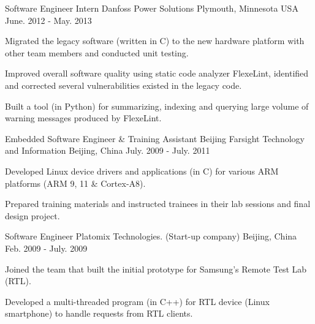 \begin{cventries}
  \cventry
    {Software Engineer Intern} %
    {Danfoss Power Solutions} %
    {Plymouth, Minnesota USA} %
    {June. 2012 - May. 2013} %
    {
      \begin{cvitems} %
        \item {Migrated the legacy software (written in C) to the new hardware
    platform with other team members and conducted unit testing.}
       \item {Improved overall software quality using static code analyzer FlexeLint, identified
    and corrected several vulnerabilities existed in the legacy code.}
           \item {Built a tool (in Python) for summarizing, indexing and
    querying large volume of warning messages produced by FlexeLint.}
      \end{cvitems}
    }

  \cventry
    {Embedded Software Engineer \& Training Assistant} %
    {Beijing Farsight Technology and Information} %
    {Beijing, China} %
    {July. 2009 - July. 2011} %
    {
      \begin{cvitems} %
        \item {Developed Linux device drivers and applications (in C) for various ARM
    platforms (ARM 9, 11 \& Cortex-A8).}
        \item {Prepared training materials and instructed trainees in
    their lab sessions and final design project.}
      \end{cvitems}
    }

  \cventry
    {Software Engineer} %
    {Platomix Technologies. (Start-up company)} %
    {Beijing, China} %
    {Feb. 2009 - July. 2009} %
    {
      \begin{cvitems} %
       \item {Joined the team that built the initial prototype for
    Samsung's Remote Test Lab (RTL).}
       \item {Developed a multi-threaded program (in C++) for RTL
    device (Linux smartphone) to handle requests from RTL clients.}
      \end{cvitems}
    }


\end{cventries}

